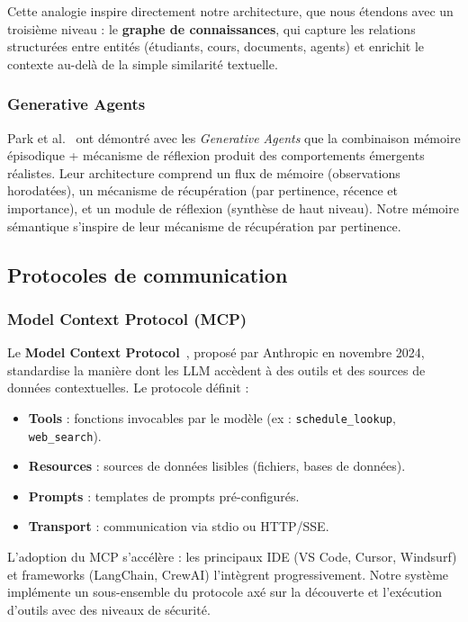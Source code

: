 \documentclass[12pt, a4paper]{article}
\newcommand{\acrshort}[1]{\MakeUppercase{#1}}
\begin{document}
Cette analogie inspire directement notre architecture, que nous étendons avec un troisième niveau : le \textbf{graphe de connaissances}, qui capture les relations structurées entre entités (étudiants, cours, documents, agents) et enrichit le contexte au-delà de la simple similarité textuelle.

\subsubsection{Generative Agents}

Park et al.~\cite{park2023generative} ont démontré avec les \textit{Generative Agents} que la combinaison mémoire épisodique + mécanisme de réflexion produit des comportements émergents réalistes. Leur architecture comprend un flux de mémoire (observations horodatées), un mécanisme de récupération (par pertinence, récence et importance), et un module de réflexion (synthèse de haut niveau). Notre mémoire sémantique s'inspire de leur mécanisme de récupération par pertinence.

\subsection{Protocoles de communication}

\subsubsection{Model Context Protocol (MCP)}

Le \textbf{Model Context Protocol}~\cite{anthropic2024mcp}, proposé par Anthropic en novembre 2024, standardise la manière dont les \acrshort{llm} accèdent à des outils et des sources de données contextuelles. Le protocole définit :

\begin{itemize}
  \item \textbf{Tools} : fonctions invocables par le modèle (ex : \texttt{schedule\_lookup}, \texttt{web\_search}).
  \item \textbf{Resources} : sources de données lisibles (fichiers, bases de données).
  \item \textbf{Prompts} : templates de prompts pré-configurés.
  \item \textbf{Transport} : communication via stdio ou HTTP/SSE.
\end{itemize}

L'adoption du MCP s'accélère : les principaux IDE (VS Code, Cursor, Windsurf) et frameworks (LangChain, CrewAI) l'intègrent progressivement. Notre système implémente un sous-ensemble du protocole axé sur la découverte et l'exécution d'outils avec des niveaux de sécurité.
\end{document}
